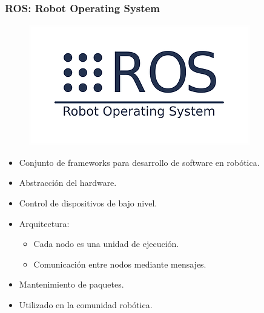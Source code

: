 \documentclass[compress]{beamer}
\begin{document}
\begin{frame}
	\frametitle{ROS: Robot Operating System}
    \begin{figure}[htb]
        \centering
        \includegraphics[width=0.55\columnwidth]{method/ros.png}
    \end{figure}
	\vspace{-2em}
    \begin{itemize}
 		\item Conjunto de frameworks para desarrollo de software en robótica.
        \item Abstracción del hardware.
        \item Control de dispositivos de bajo nivel.
        \item Arquitectura:
            \begin{itemize}
	        	\item Cada nodo es una unidad de ejecución.
	        	\item Comunicación entre nodos mediante mensajes.
	        \end{itemize}
        \item Mantenimiento de paquetes.
        \item Utilizado en la comunidad robótica.
    \end{itemize}
\end{frame}
\end{document}
